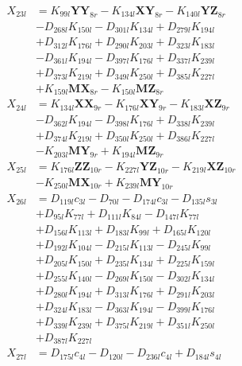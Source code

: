 \begin{multicols}{2}
\begin{align}
X_{23l} &= K_{99l}\mathbf{YY}_{8r} - K_{134l}\mathbf{XY}_{8r} - K_{140l}\mathbf{YZ}_{8r}  \nonumber \\
&- D_{268l}K_{150l} - D_{301l}K_{134l} + D_{279l}K_{194l}  \nonumber \\
&+ D_{312l}K_{176l} + D_{290l}K_{203l} + D_{323l}K_{183l}  \nonumber \\
&- D_{361l}K_{194l} - D_{397l}K_{176l} + D_{337l}K_{239l}  \nonumber \\
&+ D_{373l}K_{219l} + D_{349l}K_{250l} + D_{385l}K_{227l}  \nonumber \\
&+ K_{159l}\mathbf{MX}_{8r} - K_{150l}\mathbf{MZ}_{8r} \nonumber \\
X_{24l} &= K_{134l}\mathbf{XX}_{9r} - K_{176l}\mathbf{XY}_{9r} - K_{183l}\mathbf{XZ}_{9r}  \nonumber \\
&- D_{362l}K_{194l} - D_{398l}K_{176l} + D_{338l}K_{239l}  \nonumber \\
&+ D_{374l}K_{219l} + D_{350l}K_{250l} + D_{386l}K_{227l}  \nonumber \\
&- K_{203l}\mathbf{MY}_{9r} + K_{194l}\mathbf{MZ}_{9r} \nonumber \\
X_{25l} &= K_{176l}\mathbf{ZZ}_{10r} - K_{227l}\mathbf{YZ}_{10r} - K_{219l}\mathbf{XZ}_{10r}  \nonumber \\
&- K_{250l}\mathbf{MX}_{10r} + K_{239l}\mathbf{MY}_{10r} \nonumber \\
X_{26l} &= D_{119l}c_{3l} - D_{70l} - D_{174l}c_{3l} - D_{135l}s_{3l}  \nonumber \\
&+ D_{95l}K_{77l} + D_{111l}K_{84l} - D_{147l}K_{77l}  \nonumber \\
&+ D_{156l}K_{113l} + D_{183l}K_{99l} + D_{165l}K_{120l}  \nonumber \\
&+ D_{192l}K_{104l} - D_{215l}K_{113l} - D_{245l}K_{99l}  \nonumber \\
&+ D_{205l}K_{150l} + D_{235l}K_{134l} + D_{225l}K_{159l}  \nonumber \\
&+ D_{255l}K_{140l} - D_{269l}K_{150l} - D_{302l}K_{134l}  \nonumber \\
&+ D_{280l}K_{194l} + D_{313l}K_{176l} + D_{291l}K_{203l}  \nonumber \\
&+ D_{324l}K_{183l} - D_{363l}K_{194l} - D_{399l}K_{176l}  \nonumber \\
&+ D_{339l}K_{239l} + D_{375l}K_{219l} + D_{351l}K_{250l}  \nonumber \\
&+ D_{387l}K_{227l} \nonumber \\
X_{27l} &= D_{175l}c_{4l} - D_{120l} - D_{236l}c_{4l} + D_{184l}s_{4l}  \nonumber \\

\end{align}
\end{multicols}
